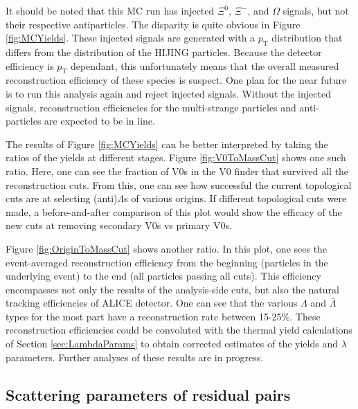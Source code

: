
It should be noted that this MC run has injected $\Xi^0$, $\Xi^-$, and $\Omega$ signals, but not their respective antiparticles.  The disparity is quite obvious in Figure \ref{fig:MCYields}.  These injected signals are generated with a $p_\mathrm{T}$ distribution that differs from the distribution of the HIJING particles.  Because the detector efficiency is $p_\mathrm{T}$ dependant, this unfortunately means that the overall measured reconstruction efficiency of these species is suspect.  One plan for the near future is to run this analysis again and reject injected signals.  Without the injected signals, reconstruction efficiencies for the multi-strange particles and anti-particles are expected to be in line.

The results of Figure \ref{fig:MCYields} can be better interpreted by taking the ratios of the yields at different stages.  Figure \ref{fig:V0ToMassCut} shows one such ratio.  Here, one can see the fraction of V0s in the V0 finder that survived all the reconstruction cuts.  From this, one can see how successful the current topological cuts are at selecting (anti)$\Lambda$s of various origins.   If different topological cuts were made, a before-and-after comparison of this plot would show the efficacy of the new cuts at removing secondary V0s vs primary V0s.

Figure \ref{fig:OriginToMassCut} shows another ratio.  In this plot, one sees the event-averaged reconstruction efficiency from the beginning (particles in the underlying event) to the end (all particles passing all cuts).  This efficiency encompasses not only the results of the analysis-side cuts, but also the natural tracking efficiencies of ALICE detector.  One can see that the various $\Lambda$ and $\bar{\Lambda}$ types for the most part have a reconstruction rate between 15-25\%.  These reconstruction efficiencies could be convoluted with the thermal yield calculations of Section \ref{sec:LambdaParams} to obtain corrected estimates of the yields and $\lambda$ parameters.  Further analyses of these results are in progress.


\subsection{Scattering parameters of residual pairs}
\label{sec:ScatteringParams}

